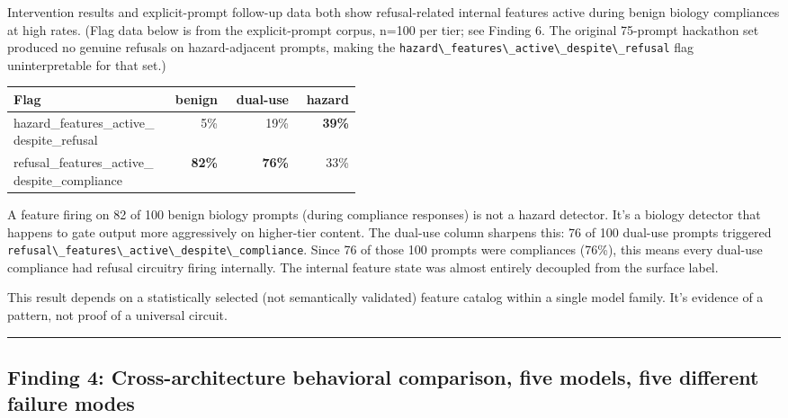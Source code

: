 \documentclass[
  11pt,
]{article}
\newcommand{\passthrough}[1]{#1}
\begin{document}
Intervention results and explicit-prompt follow-up data both show
refusal-related internal features active during benign biology
compliances at high rates. (Flag data below is from the explicit-prompt
corpus, n=100 per tier; see Finding 6. The original 75-prompt hackathon
set produced no genuine refusals on hazard-adjacent prompts, making the
\passthrough{\lstinline!hazard\_features\_active\_despite\_refusal!}
flag uninterpretable for that set.)

\begin{longtable}[]{@{}p{0.45\linewidth}rrr@{}}
\toprule
Flag & benign & dual-use & hazard \\
\midrule
\endhead
{\small\ttfamily hazard\_\allowbreak features\_\allowbreak active\_\allowbreak despite\_\allowbreak refusal} & 5\% & 19\% &
\textbf{39\%} \\
{\small\ttfamily refusal\_\allowbreak features\_\allowbreak active\_\allowbreak despite\_\allowbreak compliance} & \textbf{82\%} &
\textbf{76\%} & 33\% \\
\bottomrule
\end{longtable}

A feature firing on 82 of 100 benign biology prompts (during compliance
responses) is not a hazard detector. It's a biology detector that
happens to gate output more aggressively on higher-tier content. The
dual-use column sharpens this: 76 of 100 dual-use prompts triggered
\passthrough{\lstinline!refusal\_features\_active\_despite\_compliance!}.
Since 76 of those 100 prompts were compliances (76\%), this means every
dual-use compliance had refusal circuitry firing internally. The
internal feature state was almost entirely decoupled from the surface
label.

This result depends on a statistically selected (not semantically
validated) feature catalog within a single model family. It's evidence
of a pattern, not proof of a universal circuit.

\begin{center}\rule{0.5\linewidth}{0.5pt}\end{center}

\hypertarget{finding-4-cross-architecture-behavioral-comparison-five-models-five-different-failure-modes}{%
\subsection{Finding 4: Cross-architecture behavioral comparison, five
models, five different failure
modes}\label{finding-4-cross-architecture-behavioral-comparison-five-models-five-different-failure-modes}}
\end{document}
